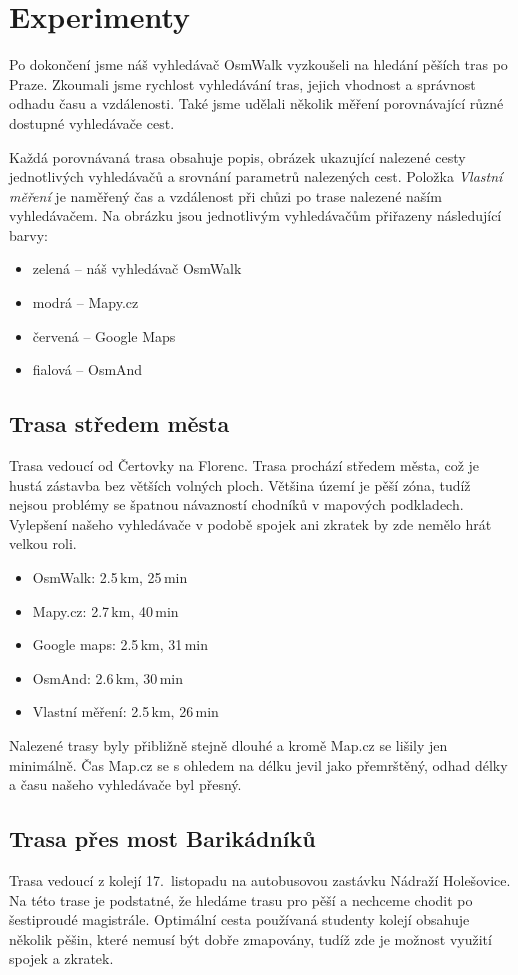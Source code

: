 \chapter{Experimenty}
Po dokončení jsme náš vyhledávač OsmWalk vyzkoušeli na hledání pěších tras po
Praze. Zkoumali jsme rychlost vyhledávání tras, jejich vhodnost a správnost
odhadu času a vzdálenosti. Také jsme udělali několik měření porovnávající různé
dostupné vyhledávače cest.

Každá porovnávaná trasa obsahuje popis, obrázek ukazující nalezené cesty
jednotlivých vyhledávačů a srovnání parametrů nalezených cest. Položka {\it
Vlastní měření} je naměřený čas a vzdálenost při chůzi po trase nalezené naším
vyhledávačem. Na obrázku jsou jednotlivým vyhledávačům přiřazeny následující
barvy:
\begin{itemize}
\item zelená -- náš vyhledávač OsmWalk
\item modrá -- Mapy.cz
\item červená -- Google Maps
\item fialová -- OsmAnd
\end{itemize}

\section{Trasa středem města}
Trasa vedoucí od Čertovky na Florenc. Trasa prochází středem města, což je hustá
zástavba bez větších volných ploch. Většina území je pěší zóna, tudíž nejsou
problémy se špatnou návazností chodníků v mapových podkladech. Vylepšení našeho
vyhledávače v podobě spojek ani zkratek by zde nemělo hrát velkou roli.
\begin{itemize}
	\item OsmWalk: 2.5\,km, 25\,min
	\item Mapy.cz: 2.7\,km, 40\,min
	\item Google maps: 2.5\,km, 31\,min
	\item OsmAnd: 2.6\,km, 30\,min
	\item Vlastní měření: 2.5\,km, 26\,min
\end{itemize}
Nalezené trasy byly přibližně stejně dlouhé a kromě Map.cz se lišily jen
minimálně. Čas Map.cz se s ohledem na délku jevil jako přemrštěný, odhad délky a
času našeho vyhledávače byl přesný. 


\section{Trasa přes most Barikádníků}
Trasa vedoucí z kolejí 17.~listopadu na autobusovou zastávku Nádraží Holešovice.
Na této trase je podstatné, že hledáme trasu pro pěší a nechceme chodit po
šestiproudé magistrále. Optimální cesta používaná studenty kolejí obsahuje
několik pěšin, které nemusí být dobře zmapovány, tudíž zde je možnost využití
spojek a zkratek.

